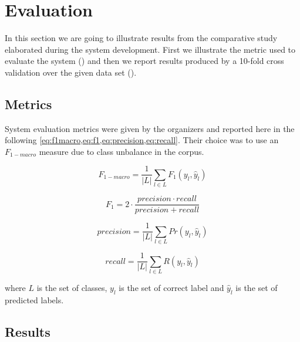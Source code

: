\section{Evaluation} \label{sec:evaluation}

In this section we are going to illustrate results from the comparative study elaborated during the system development. First we illustrate the metric used to evaluate the system () and then we report results produced by a 10-fold cross validation over the given data set ().

\subsection{Metrics} \label{subsec:metric}

System evaluation metrics were given by the organizers and reported here in the following \cref{eq:f1macro,eq:f1,eq:precision,eq:recall}. Their choice was to use an $F_{1-macro}$ measure due to class unbalance in the corpus.

\begin{multicols}{2}
\begin{equation} \label{eq:f1macro}
F_{1-macro} = \frac{1}{|L|} \displaystyle\sum_{l\in L} F_1(y_l, \hat{y}_l)
\end{equation}

\begin{equation} \label{eq:f1}
F_1 = 2 \cdot \frac{precision \cdot recall }{precision + recall}
\end{equation}

\begin{equation} \label{eq:precision}
precision = \frac{1}{|L|} \displaystyle\sum_{l\in L} Pr(y_l, \hat{y}_l)
\end{equation}

\begin{equation} \label{eq:recall}
recall = \frac{1}{|L|} \displaystyle\sum_{l\in L} R(y_l, \hat{y}_l)
\end{equation}
\end{multicols}

\noindent where $L$ is the set of classes, $y_l$ is the set of correct label and $\hat{y}_l$ is the set of predicted labels.


\subsection{Results} \label{subsec:results}

